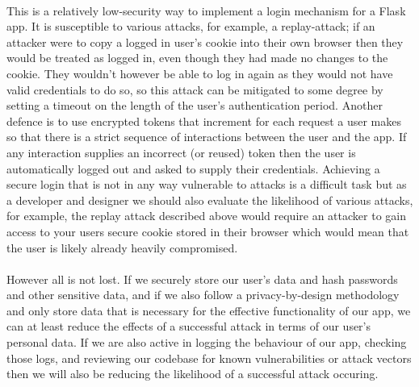 \documentclass[12pt, a4paper, twoside]{book}
\begin{document}
\paragraph{} This is a relatively low-security way to implement a login mechanism for a Flask app. It is susceptible to various attacks, for example, a replay-attack; if an attacker were to copy a logged in user's cookie into their own browser then they would be treated as logged in, even though they had made no changes to the cookie. They wouldn't however be able to log in again as they would not have valid credentials to do so, so this attack can be mitigated to some degree by setting a timeout on the length of the user's authentication period. Another defence is to use encrypted tokens that increment for each request a user makes so that there is a strict sequence of interactions between the user and the app. If any interaction supplies an incorrect (or reused) token then the user is automatically logged out and asked to supply their credentials. Achieving a secure login that is not in any way vulnerable to attacks is a difficult task but as a developer and designer we should also evaluate the likelihood of various attacks, for example, the replay attack described above would require an attacker to gain access to your users secure cookie stored in their browser which would mean that the user is likely already heavily compromised.

\paragraph{} However all is not lost. If we securely store our user's data and hash passwords and other sensitive data, and if we also follow a privacy-by-design methodology and only store data that is necessary for the effective functionality of our app, we can at least reduce the effects of a successful attack in terms of our user's personal data. If we are also active in logging the behaviour of our app, checking those logs, and reviewing our codebase for known vulnerabilities or attack vectors then we will also be reducing the likelihood of a successful attack occuring.

\end{document}

